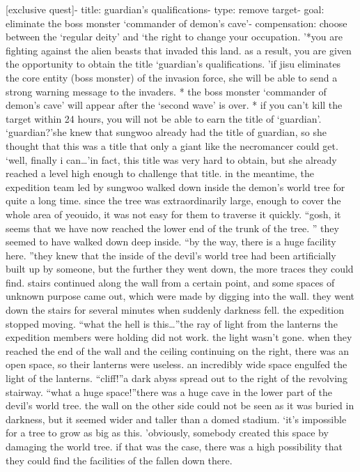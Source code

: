 [exclusive quest]- title: guardian’s qualifications- type: remove target- goal: eliminate the boss monster ‘commander of demon’s cave’- compensation: choose between the ‘regular deity’ and ‘the right to change your occupation.
’*you are fighting against the alien beasts that invaded this land.
 as a result, you are given the opportunity to obtain the title ‘guardian’s qualifications.
’if jisu eliminates the core entity (boss monster) of the invasion force, she will be able to send a strong warning message to the invaders.
* the boss monster ‘commander of demon’s cave’ will appear after the ‘second wave’ is over.
* if you can’t kill the target within 24 hours, you will not be able to earn the title of ‘guardian’.
‘guardian?’she knew that sungwoo already had the title of guardian, so she thought that this was a title that only a giant like the necromancer could get.
‘well, finally i can…’in fact, this title was very hard to obtain, but she already reached a level high enough to challenge that title.
in the meantime, the expedition team led by sungwoo walked down inside the demon’s world tree for quite a long time.
since the tree was extraordinarily large, enough to cover the whole area of yeouido, it was not easy for them to traverse it quickly.
“gosh, it seems that we have now reached the lower end of the trunk of the tree.
”
they seemed to have walked down deep inside.
“by the way, there is a huge facility here.
”they knew that the inside of the devil’s world tree had been artificially built up by someone, but the further they went down, the more traces they could find.
 stairs continued along the wall from a certain point, and some spaces of unknown purpose came out, which were made by digging into the wall.
they went down the stairs for several minutes when suddenly darkness fell.
 the expedition stopped moving.
“what the hell is this…”the ray of light from the lanterns the expedition members were holding did not work.
 the light wasn’t gone.
 when they reached the end of the wall and the ceiling continuing on the right, there was an open space, so their lanterns were useless.
 an incredibly wide space engulfed the light of the lanterns.
“cliff!”a dark abyss spread out to the right of the revolving stairway.
“what a huge space!”there was a huge cave in the lower part of the devil’s world tree.
 the wall on the other side could not be seen as it was buried in darkness, but it seemed wider and taller than a domed stadium.
‘it’s impossible for a tree to grow as big as this.
’obviously, somebody created this space by damaging the world tree.
if that was the case, there was a high possibility that they could find the facilities of the fallen down there.
